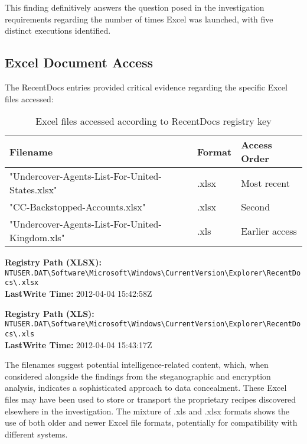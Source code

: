 This finding definitively answers the question posed in the investigation requirements regarding the number of times Excel was launched, with five distinct executions identified.

\subsection{Excel Document Access}
The RecentDocs entries provided critical evidence regarding the specific Excel files accessed:

\begin{table}[htbp]
    \centering
    \begin{tabular}{|p{7cm}|p{3cm}|p{3cm}|}
        \hline
        \textbf{Filename} & \textbf{Format} & \textbf{Access Order} \\
        \hline
        "Undercover-Agents-List-For-United-States.xlsx" & .xlsx & Most recent \\
        \hline
        "CC-Backstopped-Accounts.xlsx" & .xlsx & Second \\
        \hline
        "Undercover-Agents-List-For-United-Kingdom.xls" & .xls & Earlier access \\
        \hline
    \end{tabular}
    \caption{Excel files accessed according to RecentDocs registry key}
    \label{tab:excel_files}
\end{table}

\textbf{Registry Path (XLSX):} \texttt{NTUSER.DAT\textbackslash Software\textbackslash Microsoft\textbackslash Windows\textbackslash CurrentVersion\textbackslash Explorer\textbackslash RecentDocs\textbackslash .xlsx}\\
\textbf{LastWrite Time:} 2012-04-04 15:42:58Z

\textbf{Registry Path (XLS):} \texttt{NTUSER.DAT\textbackslash Software\textbackslash Microsoft\textbackslash Windows\textbackslash CurrentVersion\textbackslash Explorer\textbackslash RecentDocs\textbackslash .xls}\\
\textbf{LastWrite Time:} 2012-04-04 15:43:17Z

The filenames suggest potential intelligence-related content, which, when considered alongside the findings from the steganographic and encryption analysis, indicates a sophisticated approach to data concealment. These Excel files may have been used to store or transport the proprietary recipes discovered elsewhere in the investigation. The mixture of .xls and .xlsx formats shows the use of both older and newer Excel file formats, potentially for compatibility with different systems.

